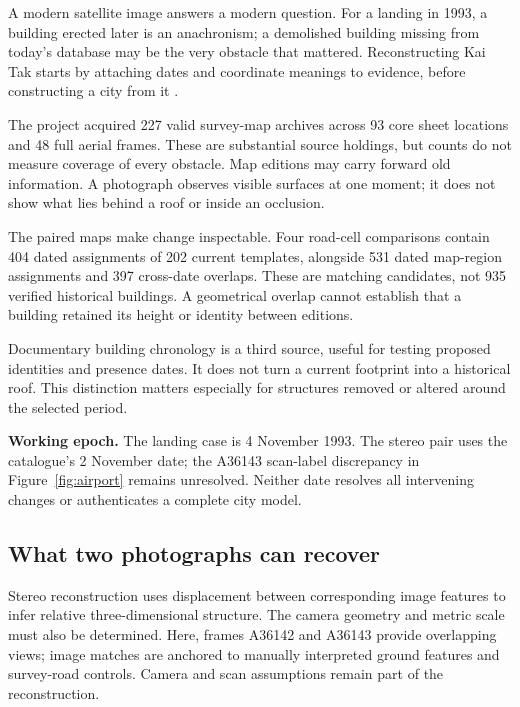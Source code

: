 \label{part:2}
A modern satellite image answers a modern question. For a landing in 1993, a building erected later is an anachronism; a demolished building missing from today's database may be the very obstacle that mattered. Reconstructing Kai Tak starts by attaching dates and coordinate meanings to evidence, before constructing a city from it \cite{maps,photos}.


The project acquired 227 valid survey-map archives across 93 core sheet locations and 48 full aerial frames. These are substantial source holdings, but counts do not measure coverage of every obstacle. Map editions may carry forward old information. A photograph observes visible surfaces at one moment; it does not show what lies behind a roof or inside an occlusion.

The paired maps make change inspectable. Four road-cell comparisons contain 404 dated assignments of 202 current templates, alongside 531 dated map-region assignments and 397 cross-date overlaps. These are matching candidates, not 935 verified historical buildings. A geometrical overlap cannot establish that a building retained its height or identity between editions.

Documentary building chronology is a third source, useful for testing proposed identities and presence dates. It does not turn a current footprint into a historical roof. This distinction matters especially for structures removed or altered around the selected period.

\textbf{Working epoch.} The landing case is 4 November 1993. The stereo pair uses the catalogue's 2 November date; the A36143 scan-label discrepancy in Figure~\ref{fig:airport} remains unresolved. Neither date resolves all intervening changes or authenticates a complete city model.
\clearpage
\subsection*{What two photographs can recover}
Stereo reconstruction uses displacement between corresponding image features to infer relative three-dimensional structure. The camera geometry and metric scale must also be determined. Here, frames A36142 and A36143 provide overlapping views; image matches are anchored to manually interpreted ground features and survey-road controls. Camera and scan assumptions remain part of the reconstruction.

